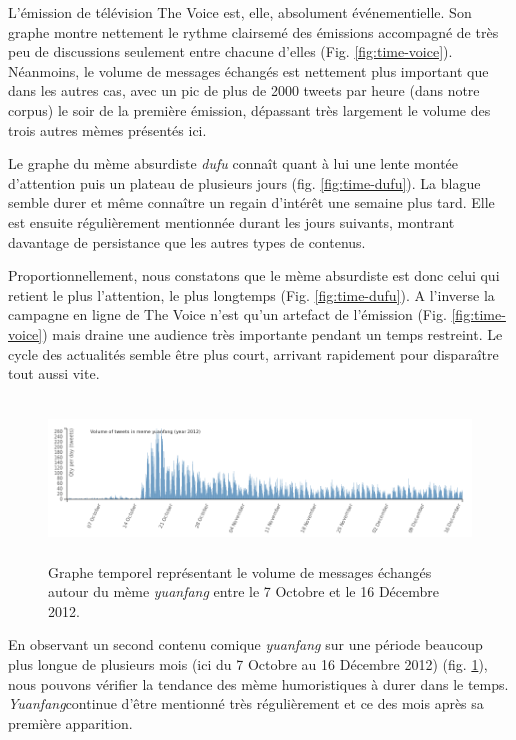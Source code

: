 L{\textquoteright}émission de télévision The Voice est, elle, absolument événementielle. Son graphe montre nettement le rythme clairsemé des émissions accompagné de très peu de discussions seulement entre chacune d'elles (Fig. \ref{fig:time-voice}). Néanmoins, le volume de messages échangés est nettement plus important que dans les autres cas, avec un pic de plus de 2000 tweets par heure (dans notre corpus) le soir de la première émission, dépassant très largement le volume des trois autres mèmes présentés ici.

Le graphe du mème absurdiste \textit{dufu} connaît quant à lui une lente montée d{\textquoteright}attention puis un plateau de plusieurs jours (fig. \ref{fig:time-dufu}). La blague semble durer et même conna\^itre un regain d{\textquoteright}intérêt une semaine plus tard. Elle est ensuite régulièrement mentionnée durant les jours suivants, montrant davantage de persistance que les autres types de contenus.

Proportionnellement, nous constatons que le mème absurdiste est donc celui qui retient le plus l{\textquoteright}attention, le plus longtemps (Fig. \ref{fig:time-dufu}). A l{\textquoteright}inverse la campagne en ligne de The Voice n{\textquoteright}est qu{\textquoteright}un artefact de l{\textquoteright}émission (Fig. \ref{fig:time-voice}) mais draine une audience très importante pendant un temps restreint. Le cycle des actualités semble être plus court, arrivant rapidement pour disparaître tout aussi vite.

\begin{figure}[h!]
    \centering
    
  \includegraphics[width=6.0087in,height=1.6697in]{figures/chap4/chapitre4-img5.png}
  \caption{
   Graphe temporel représentant le volume de messages échangés  autour du mème \textit{yuanfang} entre le 7 Octobre et le 16 Décembre 2012.
  }
  \label{fig:time-yuanfang}
\end{figure}

En observant un second contenu comique \textit{yuanfang} sur une période beaucoup plus longue de plusieurs mois (ici du 7 Octobre au 16 Décembre 2012) (fig. \ref{fig:time-yuanfang}), nous pouvons vérifier la tendance des mème humoristiques \`a durer dans le temps. \textit{Yuanfang}continue d{\textquoteright}être mentionné très régulièrement et ce des mois après sa première apparition. 

